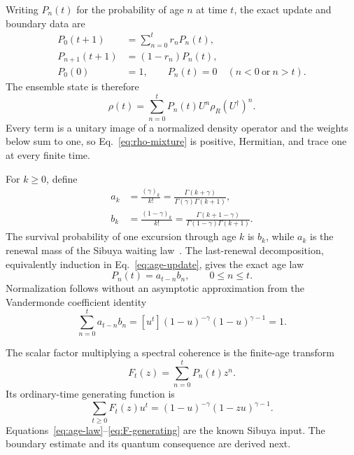 \documentclass[aps,pra,reprint,superscriptaddress,longbibliography,nofootinbib]{revtex4-2}
\begin{document}
Writing $P_n(t)$ for the probability of age $n$ at time $t$, the exact update
and boundary data are
\begin{subequations}
\begin{align}
P_0(t+1)&=\sum_{n=0}^{t}r_nP_n(t),\\
P_{n+1}(t+1)&=(1-r_n)P_n(t),\\
P_0(0)&=1,\qquad P_n(t)=0\quad(n<0\ \text{or}\ n>t).
\end{align}
\label{eq:age-update}
\end{subequations}
The ensemble state is therefore
\begin{equation}
 \rho(t)=\sum_{n=0}^{t}P_n(t)U^n\rho_R(U^\dagger)^n.
 \label{eq:rho-mixture}
\end{equation}
Every term is a unitary image of a normalized density operator and the weights
below sum to one, so Eq.~\eqref{eq:rho-mixture} is positive, Hermitian, and
trace one at every finite time.

For $k\geq0$, define
\begin{align}
 a_k&=\frac{(\gamma)_k}{k!}
 =\frac{\Gamma(k+\gamma)}{\Gamma(\gamma)\Gamma(k+1)},\nonumber\\
 b_k&=\frac{(1-\gamma)_k}{k!}
 =\frac{\Gamma(k+1-\gamma)}{\Gamma(1-\gamma)\Gamma(k+1)}.
 \label{eq:ab}
\end{align}
The survival probability of one excursion through age $k$ is $b_k$, while
$a_k$ is the renewal mass of the Sibuya waiting law~\cite{Michelitsch2025}.
The last-renewal decomposition, equivalently induction in
Eq.~\eqref{eq:age-update}, gives the exact age law
\begin{equation}
 \boxed{P_n(t)=a_{t-n}b_n,\qquad 0\leq n\leq t.}
 \label{eq:age-law}
\end{equation}
Normalization follows without an asymptotic approximation from the
Vandermonde coefficient identity
\begin{equation}
 \sum_{n=0}^{t}a_{t-n}b_n
 =[u^t](1-u)^{-\gamma}(1-u)^{\gamma-1}=1.
 \label{eq:normalization}
\end{equation}

The scalar factor multiplying a spectral coherence is the finite-age
transform
\begin{equation}
 F_t(z)=\sum_{n=0}^{t}P_n(t)z^n.
 \label{eq:F-definition}
\end{equation}
Its ordinary-time generating function is
\begin{equation}
 \sum_{t\geq0}F_t(z)u^t
 =(1-u)^{-\gamma}(1-zu)^{\gamma-1}.
 \label{eq:F-generating}
\end{equation}
Equations~\eqref{eq:age-law}--\eqref{eq:F-generating} are the known Sibuya
input.  The boundary estimate and its quantum consequence are derived next.
\end{document}
